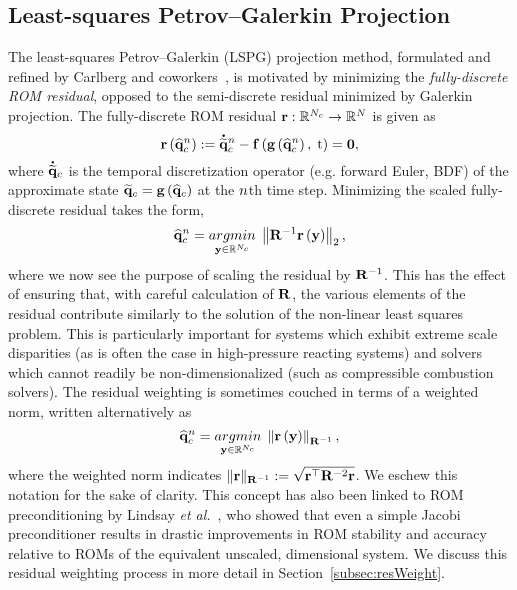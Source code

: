 \subsection{Least-squares Petrov--Galerkin Projection}

The least-squares Petrov--Galerkin (LSPG) projection method, formulated and refined by Carlberg and coworkers~\cite{Carlberg2010,Carlberg2013,Carlberg2017}, is motivated by minimizing the \textit{fully-discrete ROM residual}, opposed to the semi-discrete residual minimized by Galerkin projection. The fully-discrete ROM residual $\mathbf{r}: \mathbb{R}^{N_c} \rightarrow \mathbb{R}^{N}$ is given as
%
\begin{equation}
    \mathbf{r}\left(\mathbf{\widehat{q}}_{c}^{n}\right) := \accentset{\mbox{\large\bfseries .}}{\mathbf{\widetilde{q}}}_{c}^{n} - \mathbf{f} \left(\mathbf{g} \left(\mathbf{\widehat{q}}_{c}^{n}\right), \; \text{t}\right) = \mathbf{0},
\end{equation}
%
where $\accentset{\mbox{\large\bfseries .}}{\mathbf{\widetilde{q}}}_{c}$ is the temporal discretization operator (e.g. forward Euler, BDF) of the approximate state $\mathbf{\widetilde{q}}_{c} = \mathbf{g} \left(\mathbf{\widehat{q}}_{c}\right)$ at the $n$th time step. Minimizing the scaled fully-discrete residual takes the form,
%
\begin{equation}\label{eq:lspgLS}
    \consVecCoef^{\timeIdx} = \argmin{\dummyVec \inROne{\numConsModes}} \left\Vert \resScaleInv \resFunc{\dummyVec} \right\Vert_2,
\end{equation}
%
where we now see the purpose of scaling the residual by $\resScaleInv$. This has the effect of ensuring that, with careful calculation of $\resScale$, the various elements of the residual contribute similarly to the solution of the non-linear least squares problem. This is particularly important for systems which exhibit extreme scale disparities (as is often the case in high-pressure reacting systems) and solvers which cannot readily be non-dimensionalized (such as compressible combustion solvers). The residual weighting is sometimes couched in terms of a weighted norm, written alternatively as
%
\begin{equation}
	\consVecCoef^{\timeIdx} = \argmin{\dummyVec \inROne{\numConsModes}} \left\Vert \resFunc{\dummyVec} \right\Vert_{\resScaleInv},
\end{equation}
%
where the weighted norm indicates $\Vert\resVec\Vert_{\resScaleInv} \defEq \sqrt{\resVec^\top \resScale^{-2} \resVec}$. We eschew this notation for the sake of clarity. This concept has also been linked to ROM preconditioning by Lindsay \textit{et al.}~\cite{Lindsay2022}, who showed that even a simple Jacobi preconditioner results in drastic improvements in ROM stability and accuracy relative to ROMs of the equivalent unscaled, dimensional system. We discuss this residual weighting process in more detail in Section~\ref{subsec:resWeight}.

